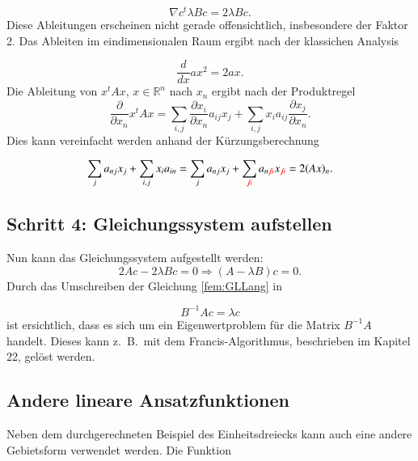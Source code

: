 \begin{equation}
	\nabla c^t \lambda Bc = 2\lambda Bc.
\end{equation}
Diese Ableitungen erscheinen nicht gerade offensichtlich, insbesondere
der Faktor 2.
Das Ableiten im  eindimensionalen Raum ergibt nach der klassichen Analysis

\begin{equation}
	\frac{d}{dx} ax^2 = 2ax.
\end{equation}
Die Ableitung von $x^tAx$, $x \in \mathbb{R}^n $ nach $x_n$ ergibt
nach der Produktregel
\begin{equation}
\frac{\partial}{\partial x_n} x^tAx
=
\sum_{i,j} \frac{\partial x_i}{\partial x_n} a_{ij} x_j
+
\sum_{i,j} x_i a_{ij} \frac{\partial x_j}{\partial x_n}.
\end{equation}
Dies kann vereinfacht werden anhand der Kürzungsberechnung

\begin{equation}
\sum_{j} a_{nj} x_j + \sum_{i,j} x_i a_{in}
=
\sum_{j} a_{nj} x_j + \sum_{\color{red}{\not{j}} i} a_{n \color{red}{\not{j}} i} x_{\color{red}{\not{j}} i}
=
2(Ax)_n.
\end{equation}

\subsection{Schritt 4: Gleichungssystem aufstellen}
Nun kann das Gleichungssystem aufgestellt werden:
\begin{equation}
	2Ac - 2\lambda Bc = 0 \Rightarrow (A-\lambda B)c = 0.
	\label{fem:GLLang}
\end{equation}
Durch das Umschreiben der Gleichung \eqref{fem:GLLang} in 

\begin{equation}
B^{-1}Ac = \lambda c
\end{equation}
ist ersichtlich, dass es sich um ein Eigenwertproblem für die Matrix
$B^{-1}A$ handelt.
Dieses kann z.~B.~mit dem Francis-Algorithmus, beschrieben im Kapitel
22, gelöst werden.
\subsection{Andere lineare Ansatzfunktionen
\label{fem:subsection:Ansatzfunktionen}}

Neben dem durchgerechneten Beispiel des Einheitsdreiecks kann auch
eine andere Gebietsform verwendet werden.
Die Funktion

